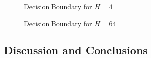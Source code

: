 \documentclass{article}
\begin{document}
  \begin{figure}[H]
 \caption{Decision Boundary for $H=4$}
 \label{fig:3}
 \end{figure}
  \begin{figure}[H]
 \caption{Decision Boundary for $H=64$}
 \label{fig:4}
 \end{figure}
\subsection{Discussion and Conclusions}
\end{document}
